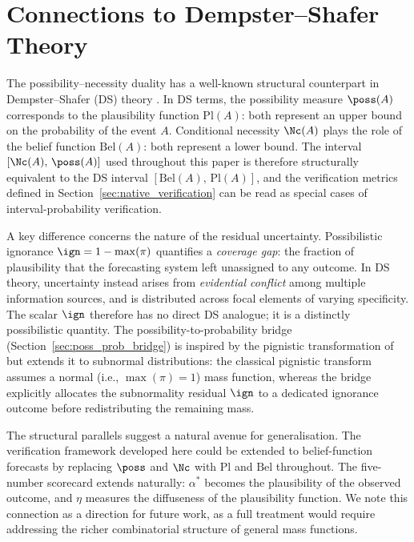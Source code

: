
\section{Connections to Dempster--Shafer Theory}%
\label{sec:ds_connections}

The possibility--necessity duality has a well-known structural
counterpart in Dempster--Shafer (DS) theory
\citep{Yager2005-at}. In DS terms, the possibility measure
$\poss(A)$ corresponds to the plausibility function $\mathrm{Pl}(A)$:
both represent an upper bound on the probability of the event $A$.
Conditional necessity $\Nc(A)$ plays the role of the belief function
$\mathrm{Bel}(A)$: both represent a lower bound. The interval
$[\Nc(A),\,\poss(A)]$ used throughout this paper is therefore
structurally equivalent to the DS interval
$[\mathrm{Bel}(A),\,\mathrm{Pl}(A)]$, and the verification metrics
defined in Section~\ref{sec:native_verification}
can be read as special cases of
interval-probability verification.

A key difference concerns the nature of the residual uncertainty.
Possibilistic ignorance $\ign = 1 - \max(\pi)$ quantifies a
\emph{coverage gap}: the fraction of plausibility that the forecasting
system left unassigned to any outcome. In DS theory, uncertainty
instead arises from \emph{evidential conflict} among multiple
information sources, and is distributed across focal elements of
varying specificity. The scalar $\ign$ therefore has no direct DS
analogue; it is a distinctly possibilistic quantity. The
possibility-to-probability bridge
(Section~\ref{sec:poss_prob_bridge}) is inspired by the pignistic
transformation of \citet{Smets1990-nf} but extends it to
subnormal distributions: the classical pignistic transform assumes a
normal (i.e., $\max(\pi)=1$) mass function, whereas the bridge
explicitly allocates the subnormality residual $\ign$ to a dedicated
ignorance outcome before redistributing the remaining mass.

The structural parallels suggest a natural avenue for generalisation.
The verification framework developed here could be extended to
belief-function forecasts by replacing $\poss$ and $\Nc$ with
$\mathrm{Pl}$ and $\mathrm{Bel}$ throughout. The five-number scorecard
extends naturally: $\alpha^{*}$ becomes the plausibility
of the observed outcome, and $\eta$ measures the diffuseness of the
plausibility function. We note
this connection as a direction for future work, as a full treatment
would require addressing the richer combinatorial structure of general
mass functions.

